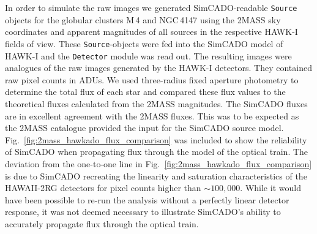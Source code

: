 In order to simulate the raw images we generated SimCADO-readable \verb+Source+ objects for the globular clusters M\,4 and NGC\,4147 using the 2MASS sky coordinates and apparent magnitudes of all sources in the respective HAWK-I fields of view.
These \verb+Source+-objects were fed into the SimCADO model of HAWK-I and the \verb+Detector+ module was read out.
The resulting images were analogues of the raw images generated by the HAWK-I detectors.
They contained raw pixel counts in ADUs.
We used three-radius fixed aperture photometry to determine the total flux of each star and compared these flux values to the theoretical fluxes calculated from the 2MASS magnitudes.
The SimCADO fluxes are in excellent agreement with the 2MASS fluxes. This was to be expected as the 2MASS catalogue provided the input for the SimCADO source model.
Fig.~\ref{fig:2mass_hawkado_flux_comparison} was included to show the reliability of SimCADO when propagating flux through the model of the optical train.
The deviation from the one-to-one line in Fig.~\ref{fig:2mass_hawkado_flux_comparison} is due to SimCADO recreating the linearity and saturation characteristics of the HAWAII-2RG detectors for pixel counts higher than $\sim 100,000$.
While it would have been possible to re-run the analysis without a perfectly linear detector response, it was not deemed necessary to illustrate SimCADO's ability to accurately propagate flux through the optical train.

